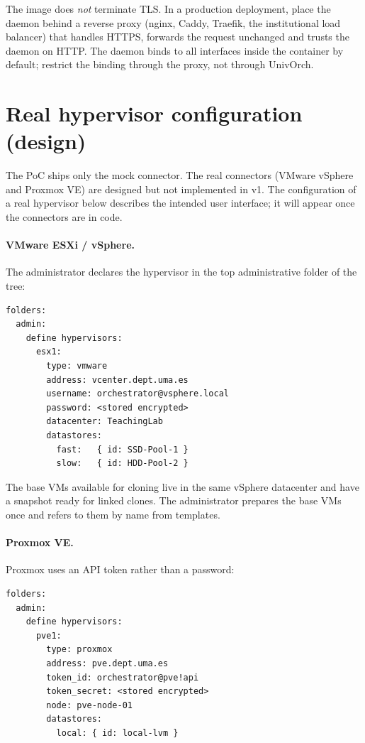 The image does \emph{not} terminate TLS. In a production
deployment, place the daemon behind a reverse proxy (nginx,
Caddy, Traefik, the institutional load balancer) that handles
HTTPS, forwards the request unchanged and trusts the daemon on
HTTP. The daemon binds to all interfaces inside the container by
default; restrict the binding through the proxy, not through
UnivOrch.

\section{Real hypervisor configuration (design)}

The PoC ships only the mock connector. The real connectors
(VMware vSphere and Proxmox VE) are designed but not implemented
in v1. The configuration of a real hypervisor below describes the
intended user interface; it will appear once the connectors are
in code.

\paragraph{VMware ESXi / vSphere.}
The administrator declares the hypervisor in the top
administrative folder of the tree:

\begin{verbatim}
folders:
  admin:
    define hypervisors:
      esx1:
        type: vmware
        address: vcenter.dept.uma.es
        username: orchestrator@vsphere.local
        password: <stored encrypted>
        datacenter: TeachingLab
        datastores:
          fast:   { id: SSD-Pool-1 }
          slow:   { id: HDD-Pool-2 }
\end{verbatim}

The base VMs available for cloning live in the same vSphere
datacenter and have a snapshot ready for linked clones. The
administrator prepares the base VMs once and refers to them by
name from templates.

\paragraph{Proxmox VE.}
Proxmox uses an API token rather than a password:

\begin{verbatim}
folders:
  admin:
    define hypervisors:
      pve1:
        type: proxmox
        address: pve.dept.uma.es
        token_id: orchestrator@pve!api
        token_secret: <stored encrypted>
        node: pve-node-01
        datastores:
          local: { id: local-lvm }
\end{verbatim}

